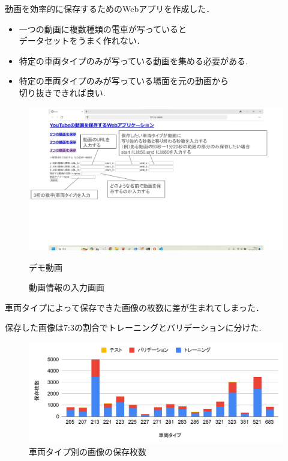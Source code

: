 動画を効率的に保存するためのWebアプリを作成した．


\begin{itemize}
	\item 一つの動画に複数種類の電車が写っていると\\データセットをうまく作れない．
	\item 特定の車両タイプのみが写っている動画を集める必要がある.
	\item 特定の車両タイプのみが写っている場面を元の動画から\\切り抜きできれば良い.
\end{itemize}
	

\newpage

\begin{figure}[htbp]

			\centering
			\includegraphics[width=0.75\linewidth]{../paper/chap3/fig/django}
			\label{fig:django}
			\caption{動画情報の入力画面}
			デモ動画\href{run:./fig/demo1.mp4}{\textcolor[hsb]{0.0, 0.7, 1.0}{\faPlayCircle[regular]}} 	

\end{figure}



\newpage

車両タイプによって保存できた画像の枚数に差が生まれてしまった．

保存した画像は7:3の割合でトレーニングとバリデーションに分けた.
\begin{figure}
	\centering
	\includegraphics[width=0.8\linewidth]{fig/chart2}
	\caption{車両タイプ別の画像の保存枚数}
	\label{fig:chart2}
\end{figure}



